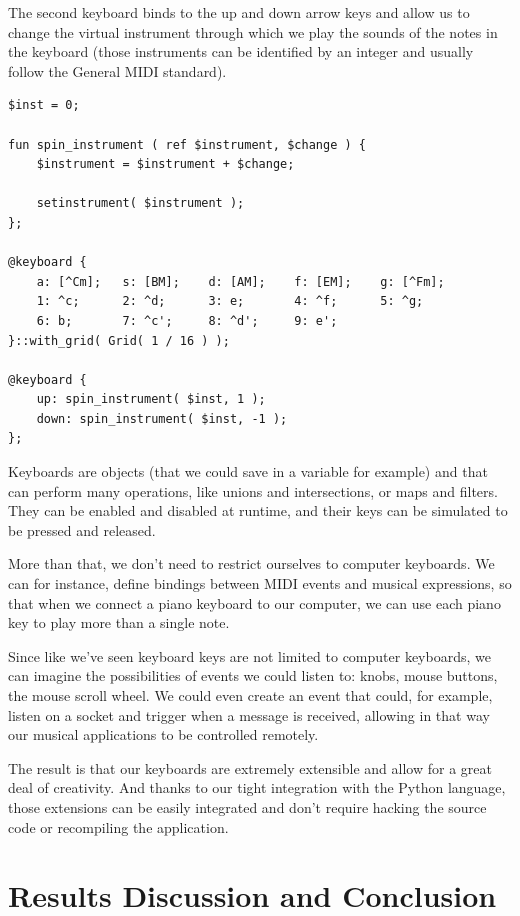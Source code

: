 \documentclass[a4paper,UKenglish,cleveref, autoref]{oasics-v2019}
\begin{document}
The second keyboard binds to the up and down arrow keys and allow us to change the virtual instrument through which we play the sounds of the notes in the keyboard (those instruments can be identified by an integer and usually follow the General MIDI standard\cite{GeneralMIDI}).

\begin{lstlisting}[caption={Creating a keyboard that can play multiple instruments},label=list:9,captionpos=t,abovecaptionskip=-\medskipamount]
$inst = 0;

fun spin_instrument ( ref $instrument, $change ) {
    $instrument = $instrument + $change;
    
    setinstrument( $instrument );
};

@keyboard {
    a: [^Cm];   s: [BM];    d: [AM];    f: [EM];    g: [^Fm];
    1: ^c;      2: ^d;      3: e;       4: ^f;      5: ^g;
    6: b;       7: ^c';     8: ^d';     9: e';
}::with_grid( Grid( 1 / 16 ) );

@keyboard {
    up: spin_instrument( $inst, 1 );
    down: spin_instrument( $inst, -1 );
};
\end{lstlisting}

Keyboards are objects (that we could save in a variable for example) and that can perform many operations, like unions and intersections, or maps and filters. They can be enabled and disabled at runtime, and their keys can be simulated to be pressed and released.

More than that, we don't need to restrict ourselves to computer keyboards. We can for instance, define bindings between MIDI events and musical expressions, so that when we connect a piano keyboard to our computer, we can use each piano key to play more than a single note.

Since like we've seen keyboard keys are not limited to computer keyboards, we can imagine the possibilities of events we could listen to: knobs, mouse buttons, the mouse scroll wheel. We could even create an event that could, for example, listen on a socket and trigger when a message is received, allowing in that way our musical applications to be controlled remotely.

The result is that our keyboards are extremely extensible and allow for a great deal of creativity. And thanks to our tight integration with the Python language, those extensions can be easily integrated and don't require hacking the source code or recompiling the application.

\section{Results Discussion and Conclusion}
\label{sec:conclusions}
\end{document}
